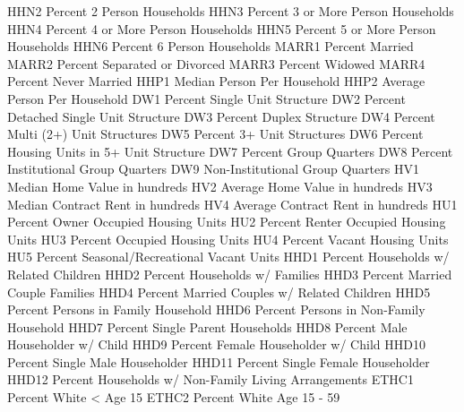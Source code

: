 \documentclass[
  11pt,
  a4paper,
  DIV=12,captions=tableheading,oneside,titlepage]{scrbook}
\let\oldverbatim\verbatim
\let\endoldverbatim\endverbatim
\renewenvironment{verbatim}{\footnotesize\oldverbatim}{\endoldverbatim}
\begin{document}
\begin{verbatim}
HHN2                        Percent 2 Person Households
HHN3                        Percent 3 or More Person Households
HHN4                        Percent 4 or More Person Households
HHN5                        Percent 5 or More Person Households
HHN6                        Percent 6 Person Households
MARR1                       Percent Married
MARR2                       Percent Separated or Divorced
MARR3                       Percent Widowed
MARR4                       Percent Never Married
HHP1                        Median Person Per Household
HHP2                        Average Person Per Household
DW1                         Percent Single Unit Structure
DW2                         Percent Detached Single Unit Structure
DW3                         Percent Duplex Structure
DW4                         Percent Multi (2+) Unit Structures
DW5                         Percent 3+ Unit Structures
DW6                         Percent Housing Units in 5+ Unit Structure
DW7                         Percent Group Quarters
DW8                         Percent Institutional Group Quarters
DW9                         Non-Institutional Group Quarters
HV1                         Median Home Value in hundreds
HV2                         Average Home Value in hundreds
HV3                         Median Contract Rent in hundreds
HV4                         Average Contract Rent in hundreds
HU1                         Percent Owner Occupied Housing Units
HU2                         Percent Renter Occupied Housing Units
HU3                         Percent Occupied Housing Units
HU4                         Percent Vacant Housing Units
HU5                         Percent Seasonal/Recreational Vacant Units
HHD1                        Percent Households w/ Related Children
HHD2                        Percent Households w/ Families
HHD3                        Percent Married Couple Families
HHD4                        Percent Married Couples w/ Related Children
HHD5                        Percent Persons in Family Household
HHD6                        Percent Persons in Non-Family Household
HHD7                        Percent Single Parent Households
HHD8                        Percent Male Householder w/ Child
HHD9                        Percent Female Householder w/ Child
HHD10                       Percent Single Male Householder
HHD11                       Percent Single Female Householder
HHD12                       Percent Households w/ Non-Family Living Arrangements
ETHC1                       Percent White < Age 15
ETHC2                       Percent White Age 15 - 59

\end{verbatim}
\end{document}
